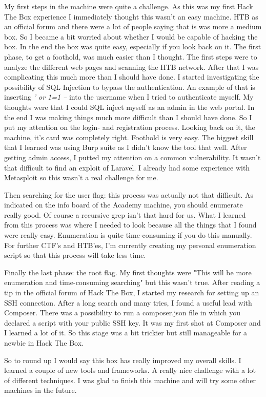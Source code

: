 \documentclass[../main.tex]{subfiles}
\begin{document}
My first steps in the machine were quite a challenge. As this was my first Hack The Box experience I immediately thought this wasn't an easy machine. HTB as an official forum and there were a lot of people saying that is was more a medium box. So I became a bit worried about whether I would be capable of hacking the box. In the end the box was quite easy, especially if you look back on it. The first phase, to get a foothold, was much easier than I thought. The first steps were to analyze the different web pages and scanning the HTB network. After that I was complicating this much more than I should have done. I started investigating the possibility of SQL Injection to bypass the authentication. An example of that is inserting \textit{' or 1=1 --} into the username when I tried to authenticate myself. My thoughts were that I could SQL inject myself as an admin in the web portal. In the end I was making things much more difficult than I should have done. So I put my attention on the login- and registration process. Looking back on it, the machine, it's card was completely right. Foothold is very easy. The biggest skill that I learned was using Burp suite as I didn't know the tool that well. After getting admin access, I putted my attention on a common vulnerability. It wasn't that difficult to find an exploit of Laravel. I already had some experience with Metasploit so this wasn't a real challenge for me.

Then searching for the user flag: this process was actually not that difficult. As indicated on the info board of the Academy machine, you should enumerate really good. Of course a recursive grep isn't that hard for us. What I learned from this process was where I needed to look because all the things that I found were really easy. Enumeration is quite time-consuming if you do this manually. For further CTF's and HTB'es, I'm currently creating my personal enumeration script so that this process will take less time.

Finally the last phase: the root flag. My first thoughts were "This will be more enumeration and time-consuming searching" but this wasn't true. After reading a tip in the official forum of Hack The Box, I started my research for setting up an SSH connection. After a long search and many tries, I found a useful lead with Composer. There was a possibility to run a composer.json file in which you declared a script with your public SSH key. It was my first shot at Composer and I learned a lot of it. So this stage was a bit trickier but still manageable for a newbie in Hack The Box.

So to round up I would say this box has really improved my overall skills. I learned a couple of new tools and frameworks. A really nice challenge with a lot of different techniques. I was glad to finish this machine and will try some other machines in the future.
\end{document}
